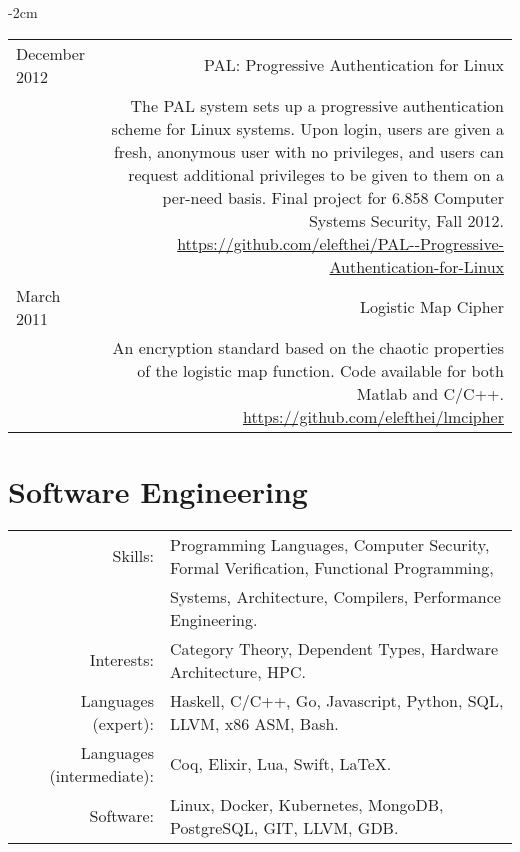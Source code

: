 \documentclass[lettersize,10pt]{article}
\begin{document}
\begin{adjustwidth}{}{-2cm}
\begin{tabularx}{\textwidth}{L R}
    December 2012 & {\sc PAL: Progressive Authentication for Linux} \\
    & The PAL system sets up a progressive authentication scheme for Linux systems. Upon login, users are given a fresh, anonymous user
    with no privileges, and users can request additional privileges to be given to them on a per-need basis. Final project for 6.858 Computer
    Systems Security, Fall 2012. \url{https://github.com/elefthei/PAL--Progressive-Authentication-for-Linux} \\

    March 2011 & {\sc Logistic Map Cipher} \\
    & An encryption standard based on the chaotic properties of the logistic map
    function. Code available for both Matlab and C/C++. \url{https://github.com/elefthei/lmcipher} \\

  \end{tabularx}
\end{adjustwidth}

\section{Software Engineering}
\begin{tabular}{rl}
Skills:& Programming Languages, Computer Security, Formal Verification, Functional Programming, \\
	   & Systems, Architecture, Compilers, Performance Engineering. \\
Interests:& Category Theory, Dependent Types, Hardware Architecture, HPC. \\
Languages (expert):& Haskell, C/C++, Go, Javascript, Python, SQL, LLVM, x86 ASM, Bash. \\
Languages (intermediate):& Coq, Elixir, Lua, Swift, \LaTeX. \\
Software:& Linux, Docker, Kubernetes, MongoDB, PostgreSQL, GIT, LLVM, GDB. \\
\end{tabular}

\end{document}
